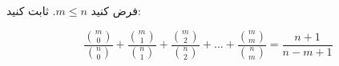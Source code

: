     \p
	فرض کنید $m\leq n$. ثابت کنید:

	$$\frac{{m \choose 0}}{{n \choose 0}}  + \frac{{m \choose 1}}{{n \choose 1}} + \frac{{m \choose 2}}{{n \choose 2}} + ... + \frac{{m \choose m}}{{n \choose m}} = \frac{n + 1}{n - m + 1}$$